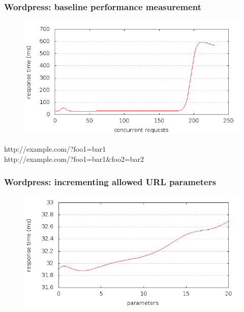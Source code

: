 \begin{frame}[noframenumbering]
  \frametitle{Wordpress: baseline performance measurement}
  \begin{figure}[H]
  \centering
  \includegraphics[scale=0.5] {../paper/images/results/baseline_wp/output.png}
  \end{figure}
\end{frame}

\begin{frame}[noframenumbering]
  \mbox{http://example.com/?foo1=bar1}\\
  \mbox{http://example.com/?foo1=bar1\&foo2=bar2}

  \frametitle{Wordpress: incrementing allowed URL parameters}
  \begin{figure}[H]
  \centering
  \includegraphics[scale=0.5] {../paper/images/results/wp_with_naxsi_incremented_allowed_parameters/output.png}
  \end{figure}
\end{frame}  
  
